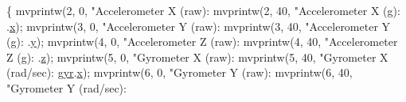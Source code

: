 \begin{DoxyCode}
\{
        mvprintw(2, 0, \textcolor{stringliteral}{"Accelerometer X (raw): %
        mvprintw(2, 40, \textcolor{stringliteral}{"Accelerometer X (g): %
      .\hyperlink{structDATA__XYZ__DOUBLE_a22868cc99a423900e7b82d015a5eb91f}{x});
        mvprintw(3, 0, \textcolor{stringliteral}{"Accelerometer Y (raw): %
        mvprintw(3, 40, \textcolor{stringliteral}{"Accelerometer Y (g): %
      .\hyperlink{structDATA__XYZ__DOUBLE_a198a27b5df3b5b0bf461b0e481e22a82}{y});
        mvprintw(4, 0, \textcolor{stringliteral}{"Accelerometer Z (raw): %
        mvprintw(4, 40, \textcolor{stringliteral}{"Accelerometer Z (g): %
      .\hyperlink{structDATA__XYZ__DOUBLE_a9556e8868c223ff3e28756ea18a284c0}{z});
        mvprintw(5, 0, \textcolor{stringliteral}{"Gyrometer X (raw):     %
        mvprintw(5, 40, \textcolor{stringliteral}{"Gyrometer X (rad/sec):   %
      \hyperlink{structIMU__DATA__STRUCT_1_1calibrated_a8a54aded6ce608f1b7d2b4a0c52c248b}{gyr}.\hyperlink{structDATA__XYZ__DOUBLE_a22868cc99a423900e7b82d015a5eb91f}{x});
        mvprintw(6, 0, \textcolor{stringliteral}{"Gyrometer Y (raw):     %
        mvprintw(6, 40, \textcolor{stringliteral}{"Gyrometer Y (rad/sec):   %
}}}}}}}}}}
\end{DoxyCode}
